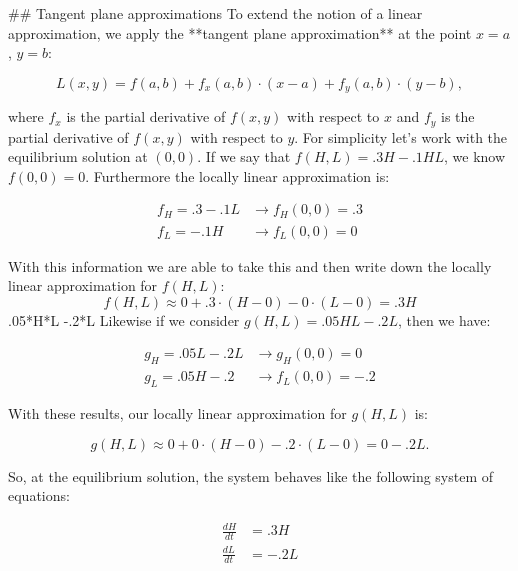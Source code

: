 \documentclass[
]{book}
\theoremstyle{definition}
\theoremstyle{definition}
\theoremstyle{definition}
\theoremstyle{remark}
\begin{document}
## Tangent plane approximations
To extend the notion of a linear approximation, we apply the **tangent plane approximation**  at the point $x=a$, $y=b$:

\begin{equation}
L(x,y) = f(a,b) + f_{x}(a,b) \cdot (x-a) + f_{y}(a,b) \cdot (y-b),
\end{equation}

where $f_{x}$ is the partial derivative of $f(x,y)$ with respect to $x$ and $f_{y}$ is the partial derivative of $f(x,y)$ with respect to $y$.  For simplicity let's work with the equilibrium solution at $(0,0)$. If we say that $f(H,L)=.3 H - .1 HL$, we know $f(0,0)=0$.  Furthermore the locally linear approximation is:


\begin{equation}
\begin{split}
f_{H} = .3 - .1L & \rightarrow f_{H}(0,0)=.3 \\
f_{L} = -.1H & \rightarrow f_{L}(0,0)=0
\end{split}
\end{equation}

With this information we are able to take this and then write down the locally linear approximation for $f(H,L)$:
\begin{equation}
f(H,L) \approx 0 + .3 \cdot (H-0) - 0 \cdot (L-0) = .3H
\end{equation}
.05*H*L -.2*L
Likewise if we consider $g(H,L)= .05HL -.2L$, then we have:

\begin{equation}
\begin{split}
g_{H} = .05L-.2L & \rightarrow g_{H}(0,0)=0 \\
g_{L} = .05H-.2 & \rightarrow f_{L}(0,0)=-.2
\end{split}
\end{equation}


With these results, our locally linear approximation for $g(H,L)$ is:

\begin{equation}
g(H,L) \approx 0 + 0  \cdot (H-0) -.2 \cdot (L-0) = 0 - .2L.
\end{equation}

So, at the equilibrium solution, the system behaves like the following system of equations:

\begin{align}
\frac{dH}{dt} &= .3H\\
\frac{dL}{dt} &= - .2L
\end{align}
\end{document}
